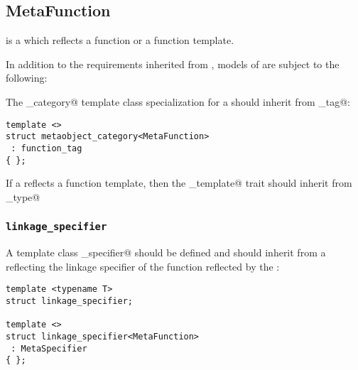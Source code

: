 \subsection{MetaFunction}
\label{concept-MetaFunction}



 is a  which reflects a function or a function template.

In addition to the requirements inherited from ,
models of  are subject to the following:

The \verb@metaobject_category@ template class specialization for a  should
inherit from \verb@function_tag@:

\begin{verbatim}
template <>
struct metaobject_category<MetaFunction>
 : function_tag
{ };
\end{verbatim}

If a  reflects a function template, then the \verb@is_template@
trait should inherit from \verb@true_type@

\subsubsection{\texttt{linkage\_specifier}}

A template class \verb@linkage_specifier@ should be defined and should inherit from
a  reflecting the linkage specifier of the function reflected by
the :

\begin{verbatim}
template <typename T>
struct linkage_specifier;

template <>
struct linkage_specifier<MetaFunction>
 : MetaSpecifier
{ };
\end{verbatim}

